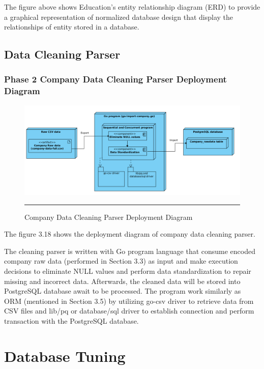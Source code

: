 The figure above shows Education's entity relationship diagram (ERD) to provide a graphical representation of normalized database design that display the relationships of entity stored in a database.

\subsection{Data Cleaning Parser}

\subsubsection{Phase 2 Company Data Cleaning Parser Deployment Diagram}

\begin{figure}[H]
	\centering
	\includegraphics[width=1.0\textwidth]{FYP2/Chapter3/FYP2-data-cleaning-deployment.png}
	\rule{35em}{0.5pt}
	\caption[Company Data Cleaning Parser Deployment Diagram]{Company Data Cleaning Parser Deployment Diagram}
\end{figure} 

The figure 3.18 shows the deployment diagram of company data cleaning parser. 

The cleaning parser is written with Go program language that consume encoded company raw data (performed in Section 3.3) as input and make execution decisions to eliminate NULL values and perform data standardization to repair missing and incorrect data. Afterwards, the cleaned data will be stored into PostgreSQL database await to be processed. The program work similarly as ORM (mentioned in Section 3.5) by utilizing go-csv driver to retrieve data from CSV files and lib/pq or database/sql driver to establish connection and perform transaction with the PostgreSQL database. 

\section{Database Tuning}

